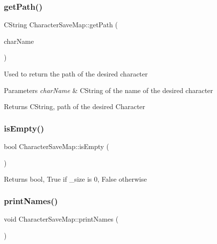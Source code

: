 \subsubsection{\texorpdfstring{get\+Path()}{getPath()}}
{\footnotesize\ttfamily C\+String Character\+Save\+Map\+::get\+Path (\begin{DoxyParamCaption}\item[{const C\+String \&}]{char\+Name }\end{DoxyParamCaption})}

Used to return the path of the desired character 
\begin{DoxyParams}{Parameters}
{\em char\+Name} & C\+String of the name of the desired character \\
\hline
\end{DoxyParams}
\begin{DoxyReturn}{Returns}
C\+String, path of the desired Character 
\end{DoxyReturn}
\hypertarget{class_character_save_map_ab184ee82d93d3e907a582f1924f05990}{}\label{class_character_save_map_ab184ee82d93d3e907a582f1924f05990} 
\subsubsection{\texorpdfstring{is\+Empty()}{isEmpty()}}
{\footnotesize\ttfamily bool Character\+Save\+Map\+::is\+Empty (\begin{DoxyParamCaption}{ }\end{DoxyParamCaption})}

\begin{DoxyReturn}{Returns}
bool, True if \+\_\+size is 0, False otherwise 
\end{DoxyReturn}
\hypertarget{class_character_save_map_a4e62aa81be98017382c268a2e1165f09}{}\label{class_character_save_map_a4e62aa81be98017382c268a2e1165f09} 
\subsubsection{\texorpdfstring{print\+Names()}{printNames()}}
{\footnotesize\ttfamily void Character\+Save\+Map\+::print\+Names (\begin{DoxyParamCaption}{ }\end{DoxyParamCaption})}

